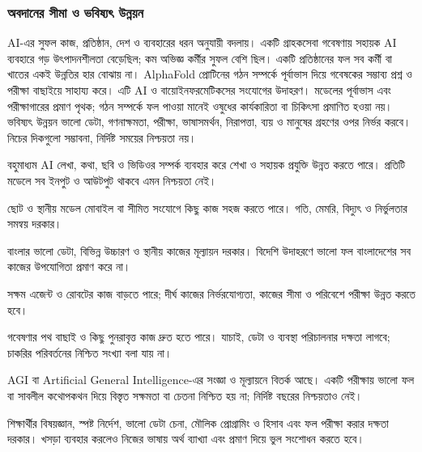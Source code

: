 \subsubsection{অবদানের সীমা ও ভবিষ্যৎ উন্নয়ন}
AI-এর সুফল কাজ, প্রতিষ্ঠান, দেশ ও ব্যবহারের ধরন অনুযায়ী বদলায়। একটি গ্রাহকসেবা গবেষণায় সহায়ক AI ব্যবহারে গড় উৎপাদনশীলতা বেড়েছিল; কম অভিজ্ঞ কর্মীর সুফল বেশি ছিল। একটি প্রতিষ্ঠানের ফল সব কর্মী বা খাতের একই উন্নতির হার বোঝায় না।
AlphaFold প্রোটিনের গঠন সম্পর্কে পূর্বাভাস দিয়ে গবেষকের সম্ভাব্য প্রশ্ন ও পরীক্ষা বাছাইয়ে সাহায্য করে। এটি AI ও বায়োইনফরমেটিকসের সংযোগের উদাহরণ। মডেলের পূর্বাভাস এবং পরীক্ষাগারের প্রমাণ পৃথক; গঠন সম্পর্কে ফল পাওয়া মানেই ওষুধের কার্যকারিতা বা চিকিৎসা প্রমাণিত হওয়া নয়।
ভবিষ্যৎ উন্নয়ন ভালো ডেটা, গণনাক্ষমতা, পরীক্ষা, ভাষাসমর্থন, নিরাপত্তা, ব্যয় ও মানুষের গ্রহণের ওপর নির্ভর করবে। নিচের দিকগুলো সম্ভাবনা, নির্দিষ্ট সময়ের নিশ্চয়তা নয়।
\begin{compactpoints}
\item বহুমাধ্যম AI লেখা, কথা, ছবি ও ভিডিওর সম্পর্ক ব্যবহার করে শেখা ও সহায়ক প্রযুক্তি উন্নত করতে পারে। প্রতিটি মডেলে সব ইনপুট ও আউটপুট থাকবে এমন নিশ্চয়তা নেই।
\item ছোট ও স্থানীয় মডেল মোবাইল বা সীমিত সংযোগে কিছু কাজ সহজ করতে পারে। গতি, মেমরি, বিদ্যুৎ ও নির্ভুলতার সমন্বয় দরকার।
\item বাংলার ভালো ডেটা, বিভিন্ন উচ্চারণ ও স্থানীয় কাজের মূল্যায়ন দরকার। বিদেশি উদাহরণে ভালো ফল বাংলাদেশের সব কাজের উপযোগিতা প্রমাণ করে না।
\item সক্ষম এজেন্ট ও রোবটের কাজ বাড়তে পারে; দীর্ঘ কাজের নির্ভরযোগ্যতা, কাজের সীমা ও পরিবেশে পরীক্ষা উন্নত করতে হবে।
\item গবেষণার পথ বাছাই ও কিছু পুনরাবৃত্ত কাজ দ্রুত হতে পারে। যাচাই, ডেটা ও ব্যবস্থা পরিচালনার দক্ষতা লাগবে; চাকরির পরিবর্তনের নিশ্চিত সংখ্যা বলা যায় না।
\item AGI বা Artificial General Intelligence-এর সংজ্ঞা ও মূল্যায়নে বিতর্ক আছে। একটি পরীক্ষায় ভালো ফল বা সাবলীল কথোপকথন দিয়ে বিস্তৃত সক্ষমতা বা চেতনা নিশ্চিত হয় না; নির্দিষ্ট বছরের নিশ্চয়তাও নেই।
\end{compactpoints}
শিক্ষার্থীর বিষয়জ্ঞান, স্পষ্ট নির্দেশ, ভালো ডেটা চেনা, মৌলিক প্রোগ্রামিং ও হিসাব এবং ফল পরীক্ষা করার দক্ষতা দরকার। খসড়া ব্যবহার করলেও নিজের ভাষায় অর্থ ব্যাখ্যা এবং প্রমাণ দিয়ে ভুল সংশোধন করতে হবে।
